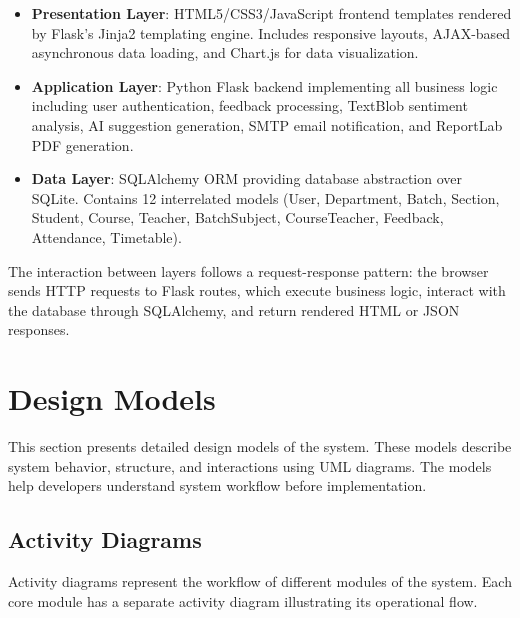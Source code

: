 \begin{itemize}
    \item \textbf{Presentation Layer}: HTML5/CSS3/JavaScript frontend templates rendered by Flask's Jinja2 templating engine. Includes responsive layouts, AJAX-based asynchronous data loading, and Chart.js for data visualization.
    \item \textbf{Application Layer}: Python Flask backend implementing all business logic including user authentication, feedback processing, TextBlob sentiment analysis, AI suggestion generation, SMTP email notification, and ReportLab PDF generation.
    \item \textbf{Data Layer}: SQLAlchemy ORM providing database abstraction over SQLite. Contains 12 interrelated models (User, Department, Batch, Section, Student, Course, Teacher, BatchSubject, CourseTeacher, Feedback, Attendance, Timetable).
\end{itemize}

The interaction between layers follows a request-response pattern: the browser sends HTTP requests to Flask routes, which execute business logic, interact with the database through SQLAlchemy, and return rendered HTML or JSON responses.


\section{Design Models}

This section presents detailed design models of the system. These models describe system behavior, structure, and interactions using UML diagrams. The models help developers understand system workflow before implementation.

\subsection{Activity Diagrams}

Activity diagrams represent the workflow of different modules of the system. Each core module has a separate activity diagram illustrating its operational flow.

